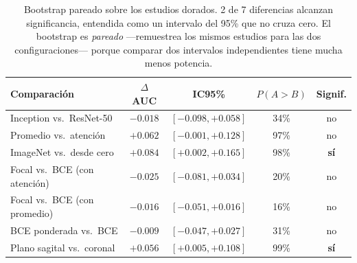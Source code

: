 \begin{table}[ht]
\centering
\caption{Bootstrap pareado sobre los estudios dorados. 2 de 7 diferencias alcanzan significancia, entendida como un intervalo del 95\% que no cruza cero. El bootstrap es \emph{pareado} —remuestrea los mismos estudios para las dos configuraciones— porque comparar dos intervalos independientes tiene mucha menos potencia.}
\label{tab:ablacion}
\begin{tabular}{lcccc}
\toprule
Comparación & $\Delta$ AUC & IC95\% & $P(A>B)$ & Signif. \\
\midrule
Inception vs.\ ResNet-50 & $-0.018$ & $[-0.098, +0.058]$ & 34\% & no \\
Promedio vs.\ atención & $+0.062$ & $[-0.001, +0.128]$ & 97\% & no \\
ImageNet vs.\ desde cero & $+0.084$ & $[+0.002, +0.165]$ & 98\% & \textbf{sí} \\
Focal vs.\ BCE (con atención) & $-0.025$ & $[-0.081, +0.034]$ & 20\% & no \\
Focal vs.\ BCE (con promedio) & $-0.016$ & $[-0.051, +0.016]$ & 16\% & no \\
BCE ponderada vs.\ BCE & $-0.009$ & $[-0.047, +0.027]$ & 31\% & no \\
Plano sagital vs.\ coronal & $+0.056$ & $[+0.005, +0.108]$ & 99\% & \textbf{sí} \\
\bottomrule
\end{tabular}
\end{table}

